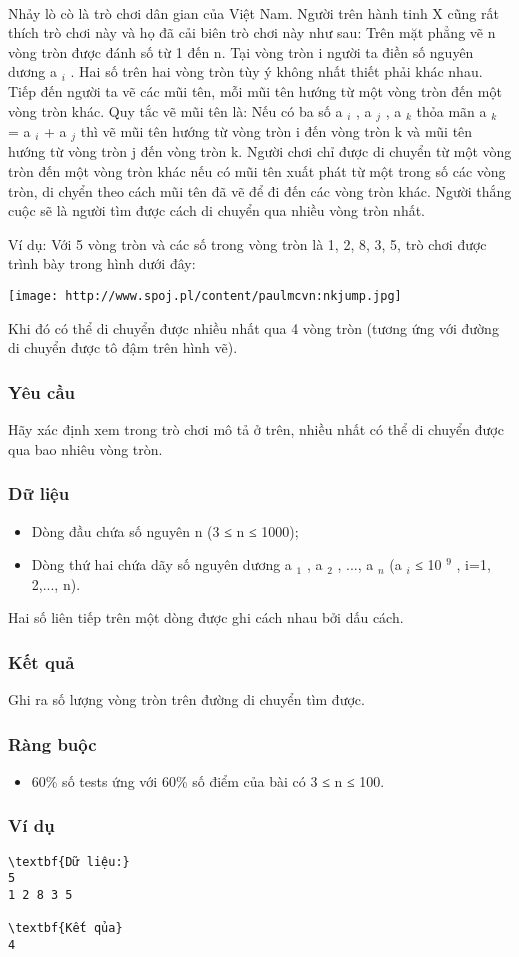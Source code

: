 

 

Nhảy lò cò là trò chơi dân gian của Việt Nam. Người trên hành tinh X cũng rất thích trò chơi này và họ đã cải biên trò chơi này như sau: Trên mặt phẳng vẽ n vòng tròn được đánh số từ 1 đến n. Tại vòng tròn i người ta điền số nguyên dương a $_ i $ . Hai số trên hai vòng tròn tùy ý không nhất thiết phải khác nhau. Tiếp đến người ta vẽ các mũi tên, mỗi mũi tên hướng từ một vòng tròn đến một vòng tròn khác. Quy tắc vẽ mũi tên là: Nếu có ba số a $_ i $ , a $_ j $ , a $_ k $ thỏa mãn a $_ k $ = a $_ i $ + a $_ j $ thì vẽ mũi tên hướng từ vòng tròn i đến vòng tròn k và mũi tên hướng từ vòng tròn j đến vòng tròn k. Người chơi chỉ được di chuyển từ một vòng tròn đến một vòng tròn khác nếu có mũi tên xuất phát từ một trong số các vòng tròn, di chyển theo cách mũi tên đã vẽ để đi đến các vòng tròn khác. Người thắng cuộc sẽ là người tìm được cách di chuyển qua nhiều vòng tròn nhất.

Ví dụ: Với 5 vòng tròn và các số trong vòng tròn là 1, 2, 8, 3, 5, trò chơi được trình bày trong hình dưới đây:


\texttt{[image: http://www.spoj.pl/content/paulmcvn:nkjump.jpg]}

Khi đó có thể di chuyển được nhiều nhất qua 4 vòng tròn (tương ứng với đường di chuyển được tô đậm trên hình vẽ).

\subsubsection{Yêu cầu}

Hãy xác định xem trong trò chơi mô tả ở trên, nhiều nhất có thể di chuyển được qua bao nhiêu vòng tròn.

\subsubsection{Dữ liệu}
\begin{itemize}
	\item Dòng đầu chứa số nguyên n (3 ≤ n ≤ 1000);
	\item Dòng thứ hai chứa dãy số nguyên dương a $_ 1 $ , a $_ 2 $ , ..., a $_ n $ (a $_ i $ ≤ 10 $^ 9 $ , i=1, 2,..., n).
\end{itemize}

Hai số liên tiếp trên một dòng được ghi cách nhau bởi dấu cách.

\subsubsection{Kết quả}

Ghi ra số lượng vòng tròn trên đường di chuyển tìm được.

\subsubsection{Ràng buộc}
\begin{itemize}
	\item 60\% số tests ứng với 60\% số điểm của bài có 3 ≤ n ≤ 100.
\end{itemize}

\subsubsection{Ví dụ}
\begin{verbatim}
\textbf{Dữ liệu:}
5
1 2 8 3 5

\textbf{Kết qủa}
4
\end{verbatim}